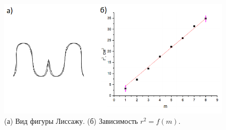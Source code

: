 \documentclass[a4paper,12pt]{article}
\begin{document}
%
\begin{figure}[h]
\includegraphics[scale=0.9]{4.png}
\centering
\caption{(а) Вид фигуры Лиссажу. (б) Зависимость $r^2 = f(m)$.}
\end{figure}
\end{document}
